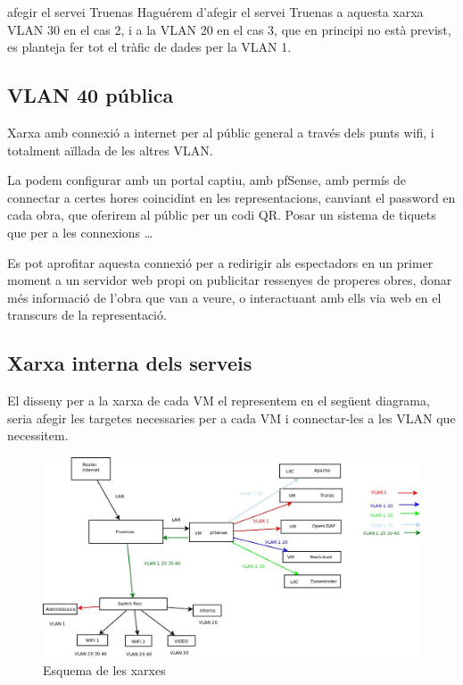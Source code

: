\documentclass[
  10pt,
]{krantz}
\begin{document}
\begin{rmdcuidao}{afegir el servei Truenas}
Haguérem d'afegir el servei Truenas a aquesta xarxa VLAN 30 en el cas 2, i a la VLAN 20 en el cas 3, que en principi no està previst, es planteja fer tot el tràfic de dades per la VLAN 1.

\end{rmdcuidao}

\hypertarget{vlan-40-puxfablica}{%
\subsection{VLAN 40 pública}\label{vlan-40-puxfablica}}

Xarxa amb connexió a internet per al públic general a través dels punts wifi, i totalment aïllada de les altres VLAN.

La podem configurar amb un portal captiu, amb pfSense, amb permís de connectar a certes hores coincidint en les representacions, canviant el password en cada obra, que oferirem al públic per un codi QR. Posar un sistema de tiquets que per a les connexions \ldots{}

Es pot aprofitar aquesta connexió per a redirigir als espectadors en un primer moment a un servidor web propi on publicitar ressenyes de properes obres, donar més informació de l'obra que van a veure, o interactuant amb ells via web en el transcurs de la representació.

\hypertarget{xarxa-interna-dels-serveis}{%
\subsection{Xarxa interna dels serveis}\label{xarxa-interna-dels-serveis}}

El disseny per a la xarxa de cada VM el representem en el següent diagrama, seria afegir les targetes necessaries per a cada VM i connectar-les a les VLAN que necessitem.

\begin{figure}
\centering
\includegraphics{imatges/proxmox/Xarxa_VLAN.jpeg}
\caption{Esquema de les xarxes}
\end{figure}
\end{document}
